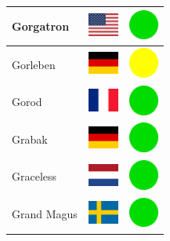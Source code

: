 \documentclass[12pt, a4paper, twoside]{report}
\begin{document}
\begin{center}
\begin{longtable}{|p{5cm}|p{2cm}|p{2cm}|}
 Gorgatron                                                  & \includegraphics[width=1cm]{../img/flags/us} &   \includegraphics[width=1cm]{../likes/y} \\ \hline
 Gorleben                                                   & \includegraphics[width=1cm]{../img/flags/de} &   \includegraphics[width=1cm]{../likes/m} \\ \hline
 Gorod                                                      & \includegraphics[width=1cm]{../img/flags/fr} &   \includegraphics[width=1cm]{../likes/y} \\ \hline
 Grabak                                                     & \includegraphics[width=1cm]{../img/flags/de} &   \includegraphics[width=1cm]{../likes/y} \\ \hline
 Graceless                                                  & \includegraphics[width=1cm]{../img/flags/nl} &   \includegraphics[width=1cm]{../likes/y} \\ \hline
 Grand Magus                                                & \includegraphics[width=1cm]{../img/flags/se} &   \includegraphics[width=1cm]{../likes/y} \\ \hline

\end{longtable}
\end{center}
\end{document}
